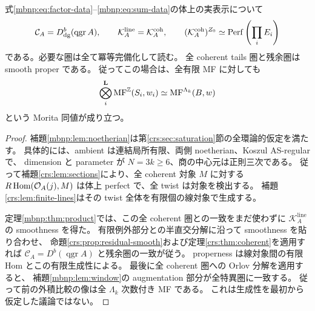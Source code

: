 \begin{corollary}
\label{mbnp:cor:coherent}
式\eqref{mbnp:eq:factor-data}--\eqref{mbnp:eq:sum-data}の体上の実表示について
\begin{equation}\label{mbnp:eq:coherent}
 \mathcal C_A=D^b_{\mathrm{dg}}(\operatorname{qgr}A),\qquad
 \mathcal K_A^{\mathrm{line}}=\mathcal K_A^{\mathrm{coh}},\qquad
 (\mathcal K_A^{\mathrm{coh}})^{Z_0}
       \simeq\operatorname{Perf}\left(\prod_iE_i\right)
\end{equation}
である。必要な圏は全て冪等完備化して読む。
全 coherent tails 圏と残余圏は smooth proper である。
従ってこの場合は、全有限 MF に対しても
\[
 \bigotimes_i^{\mathbf L}\operatorname{MF}^{\mathbb Z}(S_i,w_i)
    \simeq\operatorname{MF}^{\Lambda_k}(B,w)
\]
という Morita 同値が成り立つ。
\end{corollary}
\begin{proof}
補題\ref{mbnp:lem:noetherian}は第\ref{crs:sec:saturation}節の全環論的仮定を満たす。
具体的には、ambient は連結局所有限、両側 noetherian、Koszul AS-regular で、
dimension と parameter が $N=3k\geq6$、商の中心元は正則三次である。
従って補題\ref{crs:lem:sections}により、全 coherent 対象 $M$ に対する
$R\operatorname{Hom}(\mathcal O_A(j),M)$ は体上 perfect で、全 twist は対象を検出する。
補題\ref{crs:lem:finite-lines}はその twist 全体を有限個の線対象で生成する。

定理\ref{mbnp:thm:product}では、この全 coherent 圏との一致をまだ使わずに
$\mathcal K_A^{\mathrm{line}}$ の smoothness を得た。
有限例外部分との半直交分解に沿って smoothness を貼り合わせ、
命題\ref{crs:prop:residual-smooth}および定理\ref{crs:thm:coherent}を適用すれば
$\mathcal C_A=D^b(\operatorname{qgr}A)$ と残余圏の一致が従う。
properness は線対象間の有限 Hom とこの有限生成性による。
最後に全 coherent 圏への Orlov 分解を適用すると、
補題\ref{mbnp:lem:window}の augmentation 部分が全特異圏に一致する。
従って前の外積比較の像は全 $\Lambda_k$ 次数付き MF である。
これは生成性を最初から仮定した議論ではない。
\end{proof}

